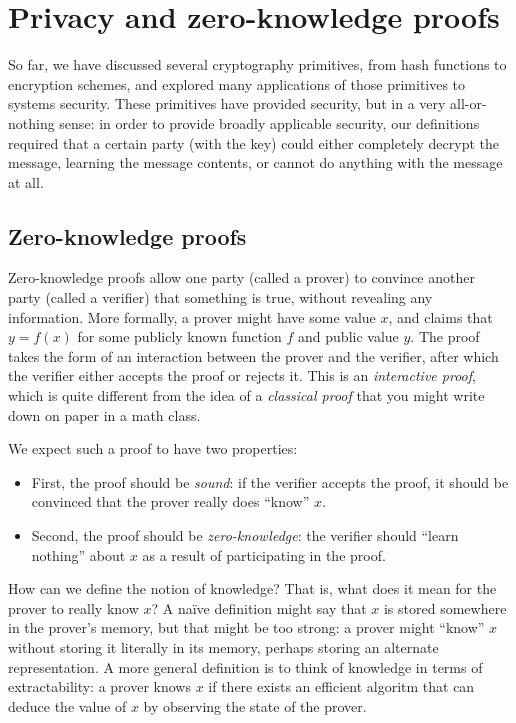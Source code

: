 \chapter{Privacy and zero-knowledge proofs}

So far, we have discussed several cryptography primitives, from hash
functions to encryption schemes, and explored many applications of those
primitives to systems security.  These primitives have provided security,
but in a very all-or-nothing sense: in order to provide broadly applicable
security, our definitions required that a certain party (with the key)
could either completely decrypt the message, learning the message
contents, or cannot do anything with the message at all.

\section{Zero-knowledge proofs}

Zero-knowledge proofs allow one party (called a prover) to convince
another party (called a verifier) that something is true, without
revealing any information.  More formally, a prover might have some
value $x$, and claims that $y=f(x)$ for some publicly known function
$f$ and public value $y$.  The proof takes the form of an interaction
between the prover and the verifier, after which the verifier either
accepts the proof or rejects it.  This is an \emph{interactive proof},
which is quite different from the idea of a \emph{classical proof}
that you might write down on paper in a math class.

We expect such a proof to have two properties:

\begin{itemize}
\item First, the proof should be \emph{sound}: if the verifier accepts the
  proof, it should be convinced that the prover really does ``know'' $x$.

\item Second, the proof should be \emph{zero-knowledge}: the verifier should
  ``learn nothing'' about $x$ as a result of participating in the proof.
\end{itemize}

How can we define the notion of knowledge?  That is, what does it mean for
the prover to really know $x$?  A na\"ive definition might say that $x$
is stored somewhere in the prover's memory, but that might be too strong:
a prover might ``know'' $x$ without storing it literally in its memory,
perhaps storing an alternate representation.  A more general definition
is to think of knowledge in terms of extractability: a prover knows $x$
if there exists an efficient algoritm that can deduce the value of $x$
by observing the state of the prover.

